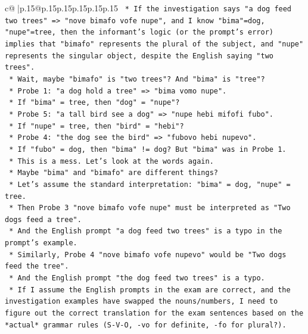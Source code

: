 \documentclass{article}
\begin{document}
{\begin{supertabular}{c@{$\;$}|p{.15\linewidth}@{}p{.15\linewidth}p{.15\linewidth}p{.15\linewidth}p{.15\linewidth}p{.15\linewidth}}
{{{\texttt{                            *   If the investigation says "a dog feed two trees" => "nove bimafo vofe nupe", and I know "bima"=dog, "nupe"=tree, then the informant's logic (or the prompt's error) implies that "bimafo" represents the plural of the subject, and "nupe" represents the singular object, despite the English saying "two trees".} \\
\texttt{                            *   Wait, maybe "bimafo" is "two trees"? And "bima" is "tree"?} \\
\texttt{                                *   Probe 1: "a dog hold a tree" => "bima vomo nupe".} \\
\texttt{                                *   If "bima" = tree, then "dog" = "nupe"?} \\
\texttt{                                *   Probe 5: "a tall bird see a dog" => "nupe hebi mifofi fubo".} \\
\texttt{                                *   If "nupe" = tree, then "bird" = "hebi"?} \\
\texttt{                                *   Probe 4: "the dog see the bird" => "fubovo hebi nupevo".} \\
\texttt{                                *   If "fubo" = dog, then "bima" != dog? But "bima" was in Probe 1.} \\
\texttt{                                *   This is a mess. Let's look at the words again.} \\
\texttt{                                *   Maybe "bima" and "bimafo" are different things?} \\
\texttt{                                *   Let's assume the standard interpretation: "bima" = dog, "nupe" = tree.} \\
\texttt{                                *   Then Probe 3 "nove bimafo vofe nupe" must be interpreted as "Two dogs feed a tree".} \\
\texttt{                                *   And the English prompt "a dog feed two trees" is a typo in the prompt's example.} \\
\texttt{                                *   Similarly, Probe 4 "nove bimafo vofe nupevo" would be "Two dogs feed the tree".} \\
\texttt{                                *   And the English prompt "the dog feed two trees" is a typo.} \\
\texttt{                                *   If I assume the English prompts in the exam are correct, and the investigation examples have swapped the nouns/numbers, I need to figure out the correct translation for the exam sentences based on the *actual* grammar rules (S{-}V{-}O, {-}vo for definite, {-}fo for plural?).} \\
}}}
\end{supertabular}}
\end{document}
